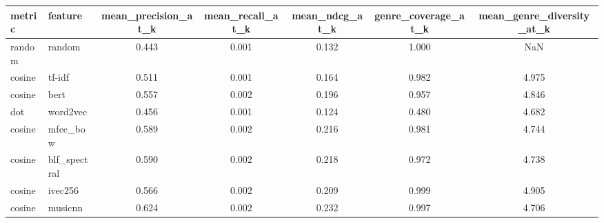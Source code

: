 \begin{tabular}{llccccc}
\toprule
metric & feature & mean_precision_at_k & mean_recall_at_k & mean_ndcg_at_k & genre_coverage_at_k & mean_genre_diversity_at_k \\
\midrule
random & random & 0.443 & 0.001 & 0.132 & 1.000 & NaN \\
cosine & tf-idf & 0.511 & 0.001 & 0.164 & 0.982 & 4.975 \\
cosine & bert & 0.557 & 0.002 & 0.196 & 0.957 & 4.846 \\
dot & word2vec & 0.456 & 0.001 & 0.124 & 0.480 & 4.682 \\
cosine & mfcc_bow & 0.589 & 0.002 & 0.216 & 0.981 & 4.744 \\
cosine & blf_spectral & 0.590 & 0.002 & 0.218 & 0.972 & 4.738 \\
cosine & ivec256 & 0.566 & 0.002 & 0.209 & 0.999 & 4.905 \\
cosine & musicnn & 0.624 & 0.002 & 0.232 & 0.997 & 4.706 \\
\bottomrule
\end{tabular}
